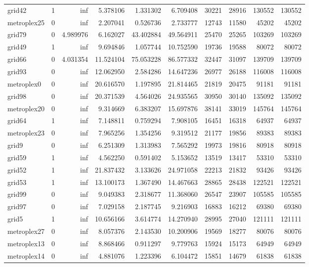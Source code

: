 \begin{longtable}{|l|r|r|r|r|r|r|r|r|r|}
grid42 & 1 & inf & 5.378106 & 1.331302 & 6.709408 & 30221 & 28916 & 130552 & 130552 \\
metroplex25 & 0 & inf & 2.207041 & 0.526736 & 2.733777 & 12743 & 11580 & 45202 & 45202 \\
grid79 & 0 & 4.989976 & 6.162027 & 43.402884 & 49.564911 & 25470 & 25265 & 103269 & 103269 \\
grid49 & 1 & inf & 9.694846 & 1.057744 & 10.752590 & 19736 & 19588 & 80072 & 80072 \\
grid66 & 0 & 4.031354 & 11.524104 & 75.053228 & 86.577332 & 32447 & 31097 & 139709 & 139709 \\
grid93 & 0 & inf & 12.062950 & 2.584286 & 14.647236 & 26977 & 26188 & 116008 & 116008 \\
metroplex0 & 0 & inf & 20.616570 & 1.197895 & 21.814465 & 21819 & 20475 & 91181 & 91181 \\
grid98 & 0 & inf & 20.371539 & 4.564026 & 24.935565 & 30950 & 30140 & 135092 & 135092 \\
metroplex20 & 0 & inf & 9.314669 & 6.383207 & 15.697876 & 38141 & 33019 & 145764 & 145764 \\
grid64 & 1 & inf & 7.148811 & 0.759294 & 7.908105 & 16451 & 16318 & 64937 & 64937 \\
metroplex23 & 0 & inf & 7.965256 & 1.354256 & 9.319512 & 21177 & 19856 & 89383 & 89383 \\
grid9 & 0 & inf & 6.251309 & 1.313983 & 7.565292 & 19973 & 19816 & 80918 & 80918 \\
grid59 & 1 & inf & 4.562250 & 0.591402 & 5.153652 & 13519 & 13417 & 53310 & 53310 \\
grid52 & 1 & inf & 21.837432 & 3.133626 & 24.971058 & 22213 & 21832 & 93426 & 93426 \\
grid53 & 1 & inf & 13.100173 & 1.367490 & 14.467663 & 28865 & 28438 & 122521 & 122521 \\
grid99 & 0 & inf & 9.049383 & 2.318677 & 11.368060 & 26547 & 23907 & 105585 & 105585 \\
grid97 & 0 & inf & 7.029158 & 2.187745 & 9.216903 & 16883 & 16212 & 69380 & 69380 \\
grid5 & 1 & inf & 10.656166 & 3.614774 & 14.270940 & 28995 & 27040 & 121111 & 121111 \\
metroplex27 & 0 & inf & 8.057376 & 2.143530 & 10.200906 & 19569 & 18277 & 80076 & 80076 \\
metroplex13 & 0 & inf & 8.868466 & 0.911297 & 9.779763 & 15924 & 15173 & 64949 & 64949 \\
metroplex14 & 0 & inf & 4.881076 & 1.223396 & 6.104472 & 15851 & 14679 & 61838 & 61838 \\

\end{longtable}

